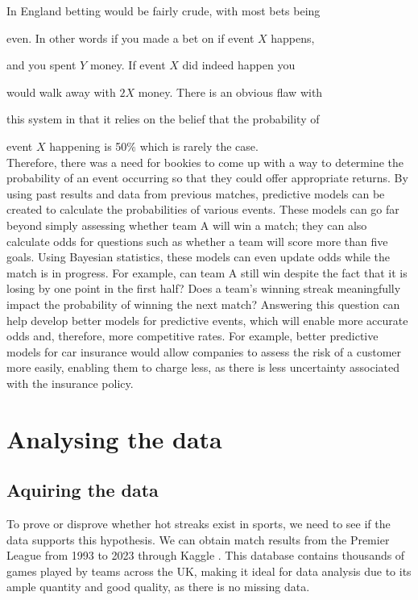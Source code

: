 \documentclass{article}
\begin{document}
\hspace{67mm}
In England betting would be fairly crude, with most bets being

\hspace{67mm}
even. In other words if you made a bet on if event $X$ happens,

\hspace{67mm}
and you spent $Y$ money. If event $X$ did indeed happen you

\hspace{67mm}
would walk away with $2X$ money.
There is an obvious flaw with

\hspace{67mm}
this system in that it relies on the belief that the probability of

\hspace{67mm}
event $X$ happening is 50$\%$ which is rarely the case.
\\[6\baselineskip]
Therefore, there was a need for bookies to come up with a way to determine the probability of an event occurring so that they could offer appropriate returns. By using past results and data from previous matches, predictive models can be created to calculate the probabilities of various events. These models can go far beyond simply assessing whether team A will win a match; they can also calculate odds for questions such as whether a team will score more than five goals. Using Bayesian statistics, these models can even update odds while the match is in progress. For example, can team A still win despite the fact that it is losing by one point in the first half?
\newline
\newline
Does a team's winning streak meaningfully impact the probability of winning the next match? Answering this question can help develop better models for predictive events, which will enable more accurate odds and, therefore, more competitive rates. For example, better predictive models for car insurance would allow \newline
companies to assess the risk of a customer more easily, enabling them to charge less, as there is less uncertainty associated with the insurance policy.
\newpage
\section{Analysing the data}\label{sec:analyse}
\subsection{Aquiring the data}
To prove or disprove whether hot streaks exist in sports, we need to see if the data supports this hypothesis. We can obtain match results from the Premier League from 1993 to 2023 through Kaggle \cite{Database}. This database contains thousands of games played by teams across the UK, making it ideal for data analysis due to its ample quantity and good quality, as there is no missing data.
\end{document}
